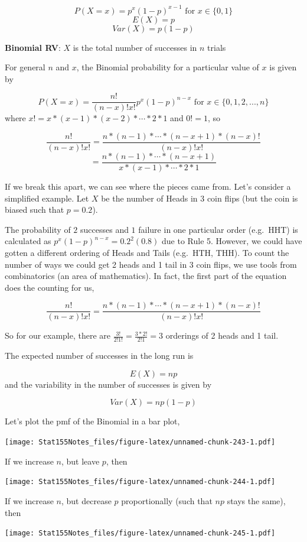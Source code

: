 \documentclass[]{book}
\begin{document}
\[P(X = x) = p^x (1-p)^{x-1} \text{ for } x\in\{0,1\}\]
\[E(X) = p\]
\[Var(X) = p(1-p) \]

\textbf{Binomial RV}: \(X\) is the total number of successes in \(n\) trials

For general \(n\) and \(x\), the Binomial probability for a particular value of \(x\) is given by

\[P(X = x) =\frac{n!}{(n-x)! x!} p^x (1-p)^{n-x}\text{ for } x\in\{0,1,2,...,n\}\]
where \(x! = x*(x-1)*(x-2)*\cdots*2*1\) and \(0! = 1\), so

\[\frac{n!}{(n-x)! x!} = \frac{n*(n-1)*\cdots*(n-x+1)*(n-x)!}{(n-x)! x!}\]
\[= \frac{n*(n-1)*\cdots*(n-x+1)}{x*(x-1)*\cdots*2*1}\]

If we break this apart, we can see where the pieces came from. Let's consider a simplified example. Let \(X\) be the number of Heads in 3 coin flips (but the coin is biased such that \(p=0.2\)).

The probability of \(2\) successes and \(1\) failure in one particular order (e.g.~HHT) is calculated as \(p^x (1-p)^{n-x} = 0.2^2(0.8)\) due to Rule 5. However, we could have gotten a different ordering of Heads and Tails (e.g.~HTH, THH). To count the number of ways we could get 2 heads and 1 tail in 3 coin flips, we use tools from combinatorics (an area of mathematics). In fact, the first part of the equation does the counting for us,

\[\frac{n!}{(n-x)! x!} = \frac{n*(n-1)*\cdots*(n-x+1)*(n-x)!}{(n-x)! x!}\]

So for our example, there are \(\frac{3!}{2!1!} = \frac{3*2!}{2!1} = 3\) orderings of 2 heads and 1 tail.

The expected number of successes in the long run is

\[E(X) = np\]
and the variability in the number of successes is given by

\[Var(X) = np(1-p) \]

Let's plot the pmf of the Binomial in a bar plot,

\texttt{[image: Stat155Notes\_files/figure-latex/unnamed-chunk-243-1.pdf]}

If we increase \(n\), but leave \(p\), then

\texttt{[image: Stat155Notes\_files/figure-latex/unnamed-chunk-244-1.pdf]}

If we increase \(n\), but decrease \(p\) proportionally (such that \(np\) stays the same), then

\texttt{[image: Stat155Notes\_files/figure-latex/unnamed-chunk-245-1.pdf]}
\end{document}
